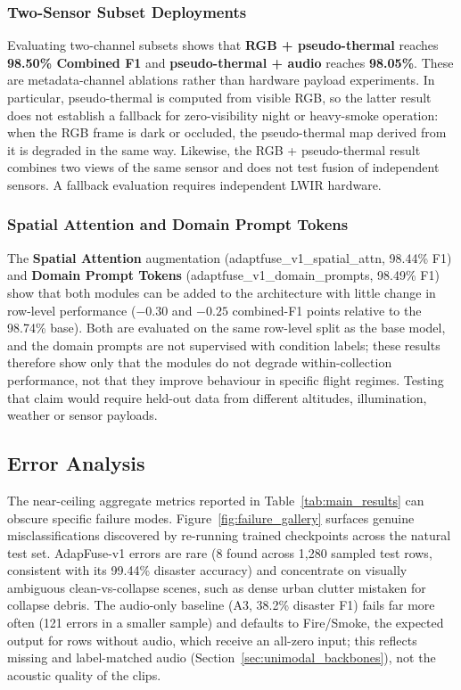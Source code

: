 \documentclass[journal]{IEEEtran}
\begin{document}
\subsubsection{Two-Sensor Subset Deployments}
\label{sec:two_sensor}
Evaluating two-channel subsets shows that \textbf{RGB + pseudo-thermal} reaches \textbf{98.50\% Combined F1} and \textbf{pseudo-thermal + audio} reaches \textbf{98.05\%}. These are metadata-channel ablations rather than hardware payload experiments. In particular, pseudo-thermal is computed from visible RGB, so the latter result does not establish a fallback for zero-visibility night or heavy-smoke operation: when the RGB frame is dark or occluded, the pseudo-thermal map derived from it is degraded in the same way. Likewise, the RGB + pseudo-thermal result combines two views of the same sensor and does not test fusion of independent sensors. A fallback evaluation requires independent LWIR hardware.

\subsubsection{Spatial Attention and Domain Prompt Tokens}
The \textbf{Spatial Attention} augmentation (adaptfuse\_v1\_spatial\_attn, 98.44\% F1) and \textbf{Domain Prompt Tokens} (adaptfuse\_v1\_domain\_prompts, 98.49\% F1) show that both modules can be added to the architecture with little change in row-level performance ($-0.30$ and $-0.25$ combined-F1 points relative to the 98.74\% base). Both are evaluated on the same row-level split as the base model, and the domain prompts are not supervised with condition labels; these results therefore show only that the modules do not degrade within-collection performance, not that they improve behaviour in specific flight regimes. Testing that claim would require held-out data from different altitudes, illumination, weather or sensor payloads.

\subsection{Error Analysis}
\label{sec:failure_gallery}

The near-ceiling aggregate metrics reported in Table~\ref{tab:main_results} can obscure specific failure modes. Figure~\ref{fig:failure_gallery} surfaces genuine misclassifications discovered by re-running trained checkpoints across the natural test set. AdapFuse-v1 errors are rare (8 found across 1{,}280 sampled test rows, consistent with its 99.44\% disaster accuracy) and concentrate on visually ambiguous clean-vs-collapse scenes, such as dense urban clutter mistaken for collapse debris. The audio-only baseline (A3, 38.2\% disaster F1) fails far more often (121 errors in a smaller sample) and defaults to Fire/Smoke, the expected output for rows without audio, which receive an all-zero input; this reflects missing and label-matched audio (Section~\ref{sec:unimodal_backbones}), not the acoustic quality of the clips.
\end{document}
